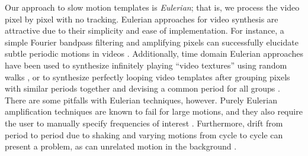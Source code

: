 \documentclass{article}
\begin{document}
Our approach to slow motion templates is {\em Eulerian}; that is, we process the video pixel by pixel with no tracking.  Eulerian approaches for video synthesis are attractive due to their simplicity and ease of implementation.  For instance, a simple Fourier bandpass filtering and amplifying pixels can successfully elucidate subtle periodic motions in videos \cite{wu2012eulerian, wadhwa2013phase}.  Additionally, time domain Eulerian approaches have been used to synthesize infinitely playing ``video textures'' using random walks \cite{schodl2000video}, or to synthesize perfectly looping video templates after grouping pixels with similar periods together and devising a common period for all groups \cite{Liao2013VideoLoops,Liao2015VideoLoops}.  There are some pitfalls with Eulerian techniques, however.  Purely Eulerian amplification techniques are known to fail for large motions, and they also require the user to manually specify frequencies of interest \cite{wu2012eulerian, wadhwa2013phase}.  Furthermore, drift from period to period due to shaking and varying motions from cycle to cycle can present a problem, as can unrelated motion in the background \cite{stauffer1999adaptive}.
\end{document}
